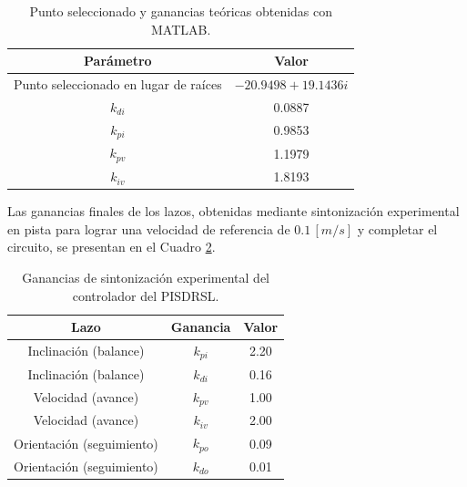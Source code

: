 \documentclass{article}
\begin{document}
\begin{table}[H]
\centering
\caption{Punto seleccionado y ganancias teóricas obtenidas con MATLAB.}
\begin{tabular}{|c|c|}\hline
    \rowcolor{gray!30}
    \textbf{Parámetro} & \textbf{Valor} \\ \hline
    Punto seleccionado en lugar de raíces & $-20.9498 + 19.1436i$ \\ \hline
    $k_{di}$ & 0.0887 \\ \hline
    $k_{pi}$ & 0.9853 \\ \hline
    $k_{pv}$ & 1.1979 \\ \hline
    $k_{iv}$ & 1.8193 \\ \hline
\end{tabular}
\label{tabla:ganancias_teoricas_matlab}
\end{table}

Las ganancias finales de los lazos, obtenidas mediante sintonización experimental en pista para lograr una velocidad de referencia de $0.1\,[m/s]$ y completar el circuito, se presentan en el Cuadro \ref{tabla:ganancias_sintonizacion}.

\begin{table}[H]
\centering
\caption{Ganancias de sintonización experimental del controlador del PISDRSL.}
\begin{tabular}{|c|c|c|}\hline
    \rowcolor{gray!30}
    \textbf{Lazo} & \textbf{Ganancia} & \textbf{Valor} \\ \hline
    Inclinación (balance) & $k_{pi}$ & 2.20 \\ \hline
    Inclinación (balance) & $k_{di}$ & 0.16 \\ \hline
    Velocidad (avance) & $k_{pv}$ & 1.00 \\ \hline
    Velocidad (avance) & $k_{iv}$ & 2.00 \\ \hline
    Orientación (seguimiento) & $k_{po}$ & 0.09 \\ \hline
    Orientación (seguimiento) & $k_{do}$ & 0.01 \\ \hline
\end{tabular}
\label{tabla:ganancias_sintonizacion}
\end{table}
\end{document}
